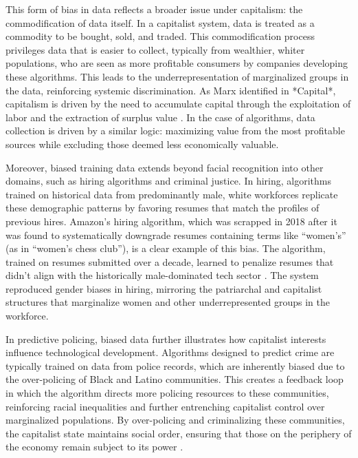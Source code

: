 This form of bias in data reflects a broader issue under capitalism: the commodification of data itself. In a capitalist system, data is treated as a commodity to be bought, sold, and traded. This commodification process privileges data that is easier to collect, typically from wealthier, whiter populations, who are seen as more profitable consumers by companies developing these algorithms. This leads to the underrepresentation of marginalized groups in the data, reinforcing systemic discrimination. As Marx identified in *Capital*, capitalism is driven by the need to accumulate capital through the exploitation of labor and the extraction of surplus value \cite[pp.~451-452]{marx1867}. In the case of algorithms, data collection is driven by a similar logic: maximizing value from the most profitable sources while excluding those deemed less economically valuable.

Moreover, biased training data extends beyond facial recognition into other domains, such as hiring algorithms and criminal justice. In hiring, algorithms trained on historical data from predominantly male, white workforces replicate these demographic patterns by favoring resumes that match the profiles of previous hires. Amazon's hiring algorithm, which was scrapped in 2018 after it was found to systematically downgrade resumes containing terms like “women’s” (as in “women’s chess club”), is a clear example of this bias. The algorithm, trained on resumes submitted over a decade, learned to penalize resumes that didn’t align with the historically male-dominated tech sector \cite[pp.~67-68]{krivoruchko2021}. The system reproduced gender biases in hiring, mirroring the patriarchal and capitalist structures that marginalize women and other underrepresented groups in the workforce.

In predictive policing, biased data further illustrates how capitalist interests influence technological development. Algorithms designed to predict crime are typically trained on data from police records, which are inherently biased due to the over-policing of Black and Latino communities. This creates a feedback loop in which the algorithm directs more policing resources to these communities, reinforcing racial inequalities and further entrenching capitalist control over marginalized populations. By over-policing and criminalizing these communities, the capitalist state maintains social order, ensuring that those on the periphery of the economy remain subject to its power \cite[pp.~25-28]{benjamin2019}.

